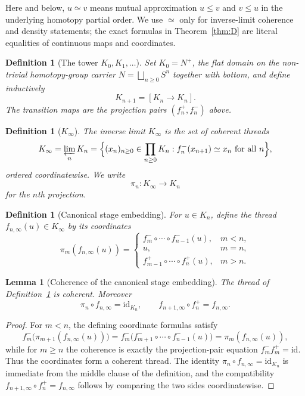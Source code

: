 \documentclass[webpdf,traditional,large,numbered]{oup-authoring-template}
\theoremstyle{thmstyleone}%
\newtheorem{lemma}[theorem]{Lemma}
\theoremstyle{thmstyletwo}%
\theoremstyle{thmstylethree}%
\newtheorem{definition}[theorem]{Definition}
\newcommand{\Kinf}{K_\infty}
\begin{document}
Here and below, $u\simeq v$ means mutual approximation
$u\le v$ and $v\le u$ in the underlying homotopy partial order.  We use
$\simeq$ only for inverse-limit coherence and density statements; the exact
formulas in Theorem~\ref{thm:D} are literal equalities of continuous maps and
coordinates.

\begin{definition}[The tower $K_0,K_1,\ldots$]
  Set $K_0=N^+$, the flat domain on the non-trivial homotopy-group carrier
  $N=\bigsqcup_{n\ge 0} S^n$ together with bottom, and define inductively
  \[
    K_{n+1}=[K_n\to K_n].
  \]
  The transition maps are the projection pairs $(f_n^+,f_n^-)$ above.
\end{definition}

\begin{definition}[$\Kinf$]
  The inverse limit $\Kinf$ is the set of coherent threads
  \[
    \Kinf=\varprojlim_n K_n
    =\Bigl\{(x_n)_{n\ge 0}\in \prod_{n\ge 0}K_n :
      f_n^-(x_{n+1})\simeq x_n\ \text{for all }n\Bigr\},
  \]
  ordered coordinatewise. We write
  \[
    \pi_n:\Kinf\to K_n
  \]
  for the $n$th projection.
\end{definition}

\begin{definition}[Canonical stage embedding]\label{def:stage-embedding}
  For $u\in K_n$, define the thread $f_{n,\infty}(u)\in\Kinf$ by its
  coordinates
  \[
    \pi_m(f_{n,\infty}(u))=
    \begin{cases}
      f_m^- \circ \cdots \circ f_{n-1}^-(u), & m<n,\\[1ex]
      u, & m=n,\\[1ex]
      f_{m-1}^+ \circ \cdots \circ f_n^+(u), & m>n.
    \end{cases}
  \]
\end{definition}

\begin{lemma}[Coherence of the canonical stage embedding]\label{lem:stage-embedding}
  The thread of Definition~\ref{def:stage-embedding} is coherent.  Moreover
  \[
    \pi_n\circ f_{n,\infty}=\mathrm{id}_{K_n},
    \qquad
    f_{n+1,\infty}\circ f_n^+ = f_{n,\infty}.
  \]
\end{lemma}

\begin{proof}
  For $m<n$, the defining coordinate formulas satisfy
  \[
    f_m^-\bigl(\pi_{m+1}(f_{n,\infty}(u))\bigr)
      = f_m^-\bigl(f_{m+1}^- \circ \cdots \circ f_{n-1}^-(u)\bigr)
      = \pi_m(f_{n,\infty}(u)),
  \]
  while for $m\ge n$ the coherence is exactly the projection-pair equation
  $f_m^-f_m^+=\mathrm{id}$.  Thus the coordinates form a coherent thread.
  The identity $\pi_n\circ f_{n,\infty}=\mathrm{id}_{K_n}$ is immediate from the
  middle clause of the definition, and the compatibility
  $f_{n+1,\infty}\circ f_n^+ = f_{n,\infty}$ follows by comparing the two sides
  coordinatewise.
\end{proof}
\end{document}
